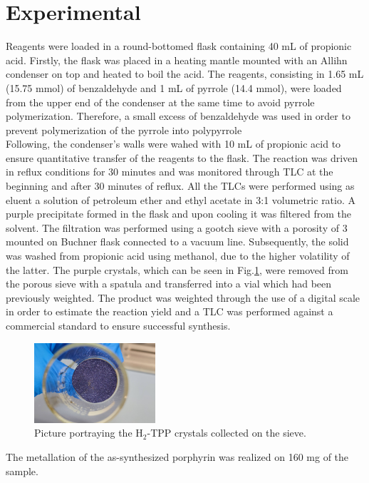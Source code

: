 \documentclass[num-refs]{wiley-article}
\begin{document}
\section{Experimental}
Reagents were loaded in a round-bottomed flask containing 40 mL of propionic acid.
Firstly, the flask was placed in a heating mantle mounted with an Allihn condenser on top and heated to boil the acid.
The reagents, consisting in 1.65 mL (15.75 mmol) of benzaldehyde and 1 mL of pyrrole (14.4 mmol), were loaded from the upper end of the condenser at the same time to avoid pyrrole polymerization.
Therefore, a small excess of benzaldehyde was used in order to prevent polymerization of the pyrrole into polypyrrole \\
Following, the condenser's walls were wahed with 10 mL of propionic acid to ensure quantitative transfer of the reagents to the flask.
The reaction was driven in reflux conditions for 30 minutes and was monitored through TLC at the beginning and after 30 minutes of reflux.
All the TLCs were performed using as eluent a solution of petroleum ether and ethyl acetate in 3:1 volumetric ratio.
A purple precipitate formed in the flask and upon cooling it was filtered from the solvent.
The filtration was performed using a gootch sieve with a porosity of 3 mounted on Buchner flask connected to a vacuum line.
Subsequently, the solid was washed from propionic acid using methanol, due to the higher volatility of the latter.
The purple crystals, which can be seen in Fig.\ref{pic-tpp}, were removed from the porous sieve with a spatula and transferred into a vial which had been previously weighted.
The product was weighted through the use of a digital scale in order to estimate the reaction yield and a TLC was performed against a commercial standard to ensure successful synthesis.\\
\begin{figure}[h]
    \centering
    \includegraphics[width=0.4\textwidth]{photo-tpp}
    \caption{Picture portraying the H$_{2}$-TPP crystals collected on the sieve.}
    \label{pic-tpp}
\end{figure}
\break
The metallation of the as-synthesized porphyrin was realized on 160 mg of the sample.
\end{document}
